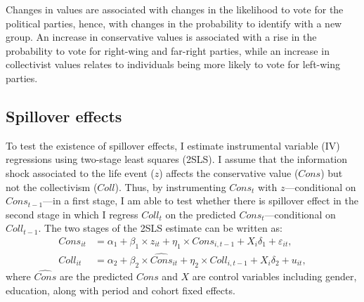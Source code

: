 Changes in values are associated with changes in the likelihood to vote for the political parties, hence, with changes in the probability to identify with a new group. An increase in conservative values is associated with a rise in the probability to vote for right-wing and far-right parties, while an increase in collectivist values relates to individuals being more likely to vote for left-wing parties.

\subsection{Spillover effects}\label{chap3-sec:spillover}

To test the existence of spillover effects, I estimate instrumental variable (IV) regressions using two-stage least squares (2SLS). I assume that the information shock associated to the life event ($z$) affects the conservative value ($Cons$) but not the collectivism ($Coll$). Thus, by instrumenting $Cons_t$ with $z$---conditional on $Cons_{t-1}$---in a first stage, I am able to test whether there is spillover effect in the second stage in which I regress $Coll_t$ on the predicted $Cons_t$---conditional on $Coll_{t-1}$. The two stages of the 2SLS estimate can be written as:
\begin{align}
    Cons_{it} &= \alpha_1 + \beta_1 \times z_{it} + \eta_1 \times Cons_{i,t-1} + X_{i} \delta_1 + \varepsilon_{it}, \label{chap3-emp:iv-stage1} \tag{IV - Stage 1}\\
    Coll_{it} &= \alpha_2 + \beta_2 \times \widehat{Cons}_{it} + \eta_2 \times Coll_{i,t-1} + X_{i} \delta_2 + u_{it}, \label{chap3-emp:iv-stage2} \tag{IV - Stage 2}
\end{align}
where $\widehat{Cons}$ are the predicted $Cons$ and $X$ are control variables including gender, education, along with period and cohort fixed effects.

